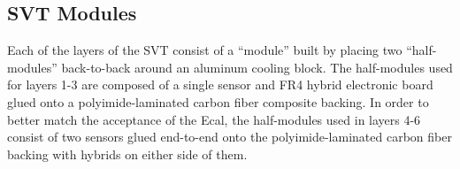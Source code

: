
\subsection{SVT Modules}

Each of the layers of the SVT consist of a ``module'' built by placing
two ``half-modules'' back-to-back around an aluminum cooling block.  The 
half-modules used for layers 1-3 are composed of a single sensor
and FR4 hybrid electronic board glued onto a polyimide-laminated carbon fiber
composite backing.  In order to better match the acceptance of the Ecal, 
the half-modules used in layers 4-6 consist of two sensors glued end-to-end onto
the polyimide-laminated carbon fiber backing with hybrids on either side of them.










